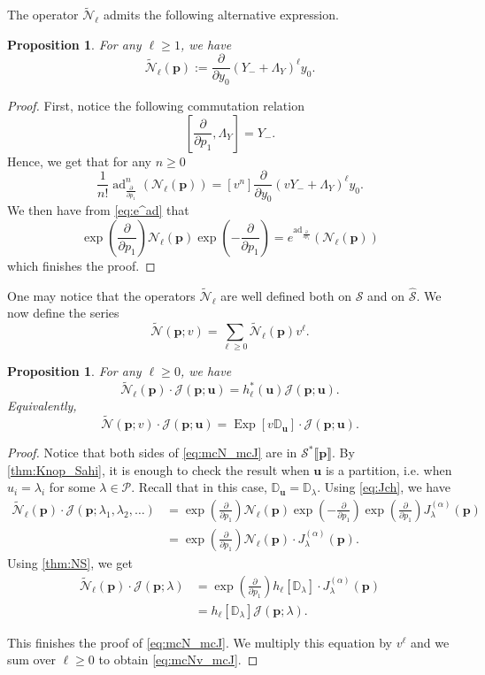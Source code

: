 \documentclass[12pt]{amsart}
\newtheorem{prop}[thm]{Proposition}
\theoremstyle{remark}
\newcommand{\bfp}{\boldsymbol{p}}
\newcommand{\bfu}{\boldsymbol{u}}
\newcommand{\J}{{J}^{(\alpha)}}
\DeclareMathOperator{\Exp}{Exp}
\DeclareMathOperator{\ad}{ad}
\newcommand{\bD}{\mathbb D}
\newcommand{\YY}{\mathcal{P}}
\newcommand{\mcJ}{\mathcal{J}}
\newcommand{\mcS}{\mathcal{S}}
\newcommand{\mcSh}{\widehat{\mathcal{S}}}
\newcommand{\mcSstar}{\mathcal{S}^*}
\newcommand{\N}{\mathcal{N}}
\newcommand{\tN}{{\mathcal{\widetilde N}}}
\begin{document}
The operator $\tN_\ell$ admits the following alternative expression.
\begin{prop}\label{prop:N_tilde}
    For any $\ell\geq 1$, we have 
    $$\tN_\ell(\bfp):=\frac{\partial}{\partial y_0}\left(Y_{-}+\Lambda_Y\right)^\ell y_0.$$
\end{prop}
\begin{proof}
First, notice the following commutation relation 
$$\left[\frac{\partial}{\partial p_1},\Lambda_Y\right]=Y_{-}.$$
Hence, we get that for any $n\geq 0$
    $$\frac{1}{n!}\ad_{\frac{\partial}{\partial p_1}}^n(\N_\ell(\bfp))=[v^n]\frac{\partial}{\partial y_0}\left(vY_-+\Lambda_Y\right)^\ell y_0.
    $$
    We then have from \cref{eq:e^ad} that
    $$\exp\left(\frac{\partial}{\partial p_1}\right) \N_\ell(\bfp) \exp\left(-\frac{\partial}{\partial p_1}\right)=e^{\ad_\frac{\partial}{\partial p_1}}\left(\N_\ell(\bfp)\right)$$
    which finishes the proof.
\end{proof}
One may notice that the operators $\tN_{\ell}$ are well defined both on $\mcS$ and on $\mcSh$. We now define the series
$$\tN(\bfp;v)=\sum_{\ell\geq 0}\tN_\ell(\bfp) v^{\ell}.$$
\begin{prop}\label{prop:N_mcJ}
    For any $\ell\geq 0$, we have
    \begin{equation}\label{eq:mcN_mcJ}
      \tN_\ell(\bfp)\cdot \mathcal{J}(\bfp;\bfu)=h_{\ell}^*(\bfu)\mathcal{J}(\bfp;\bfu).
    \end{equation}
    Equivalently,
    \begin{equation}\label{eq:mcNv_mcJ}
      \tN(\bfp;v)\cdot \mcJ(\bfp;\bfu)=\Exp[v\bD_{\bfu}]\cdot \mcJ(\bfp;\bfu).  
    \end{equation}
    
\end{prop}
\begin{proof}
Notice that both sides of \cref{eq:mcN_mcJ} are in $\mcSstar\llbracket \bfp\rrbracket.$
    By \cref{thm:Knop_Sahi}, it is enough to check the result when $\bfu$ is a partition, i.e. when  
    $u_i=\lambda_i$ for some $\lambda\in\YY$. Recall that in this case,  $\bD_{\bfu}=\bD_\lambda$.
    Using \cref{eq:Jch}, we have
    \begin{align*}
      \tN_\ell(\bfp)\cdot \mathcal{J}(\bfp;\lambda_1,\lambda_2,\dots)
      &= \exp\left(\frac{\partial}{\partial p_1}\right) \N_\ell(\bfp) \exp\left(-\frac{\partial}{\partial p_1}\right)\exp\left(\frac{\partial}{\partial p_1}\right) \J_\lambda(\bfp)\\
      &= \exp\left(\frac{\partial}{\partial p_1}\right) \N_\ell(\bfp)  \cdot \J_\lambda(\bfp).
    \end{align*}
    Using \cref{thm:NS}, we get 
    \begin{align*}
        \tN_\ell(\bfp)\cdot \mathcal{J}(\bfp;\lambda)
        &=\exp\left(\frac{\partial}{\partial p_1}\right)h_{\ell}[\bD_\lambda]  \cdot \J_\lambda(\bfp)\\
        &=h_{\ell}[\bD_\lambda] \mathcal{J}(\bfp;\lambda).
    \end{align*}
    
    This finishes the proof of \cref{eq:mcN_mcJ}. We multiply this equation by $v^{\ell}$ and we sum over $\ell\geq 0$ to obtain \cref{eq:mcNv_mcJ}.
\end{proof}
\end{document}
